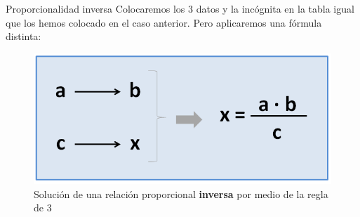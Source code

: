 \begin{infocard}{Proporcionalidad inversa}
    Colocaremos los 3 datos y la incógnita en la tabla igual que los hemos colocado en el caso anterior. Pero aplicaremos una fórmula distinta:
    \begin{figure}[H]
        \centering
        \includegraphics[width=.75\linewidth]{../images/formula-regla-de-3-img3}
        \caption{Solución de una relación proporcional \textbf{inversa} por medio de la regla de 3}
        \label{fig:}
    \end{figure}
\end{infocard}
